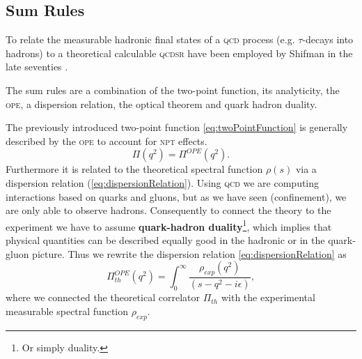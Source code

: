 \documentclass[../../index.tex]{subfiles}
\begin{document}
\subsection{Sum Rules}
\label{sec:sumRules}
To relate the measurable hadronic final states of a \textsc{qcd} process (e.g.
$\tau$-decays into hadrons) to a theoretical calculable \textsc{qcdsr} have been
employed by Shifman in the late seventies \cite{Shifman1978}.

The sum rules are a combination of the two-point function, its analyticity, the
\textsc{ope}, a dispersion relation, the optical theorem and quark hadron
duality.

The previously introduced two-point function \cref{eq:twoPointFunction} is
generally described by the \textsc{ope} to account for \textsc{npt} effects.
\begin{equation}
  \Pi(q^2) = \Pi^{OPE}(q^2).
\end{equation}
Furthermore it is related to the theoretical spectral function $\rho(s)$ via a
dispersion relation (\cref{eq:dispersionRelation}). Using \textsc{qcd} we are
computing interactions based on quarks and gluons, but as we have seen
(confinement), we are only able to observe hadrons. Consequently to connect the
theory to the experiment we have to assume \textbf{quark-hadron
  duality}\footnote{Or simply duality.}, which implies that physical quantities
can be described equally good in the hadronic or in the quark-gluon picture.
Thus we rewrite the dispersion relation \cref{eq:dispersionRelation} as
\begin{equation}
  \Pi^{OPE}_{th}(q^2) = \int_0^\infty \frac{\rho_{exp}(q^2)}{(s-q^2-i\epsilon)},
\end{equation}
where we connected the theoretical correlator $\Pi_{th}$ with the experimental
measurable spectral function $\rho_{exp}$.
\end{document}

